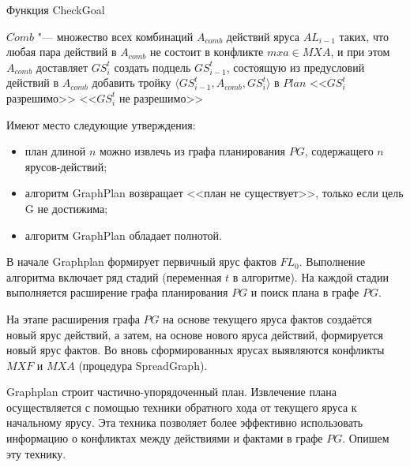 \documentclass[b5paper,11pt]{book}
\begin{document}
	\begin{algorithm}[h]
		\caption{Функция CheckGoal}\label{alg:checkgoal}
		\begin{algorithmic}[1]
				\Statex{}
				\Statex{}
				\State $Comb$ "--- множество всех комбинаций $A_{comb}$ действий яруса $AL_{i-1}$ таких, что любая пара действий в $A_{comb}$ не состоит в конфликте $mxa \in MXA$, и при этом $A_{comb}$ доставляет $GS_i^t$
					\State создать подцель $GS_{i-1}^t$, состоящую из предусловий действий в $A_{comb}$
				\EndFor
					\State добавить тройку $\langle GS_{i-1}^t, A_{comb}, GS_i^t\rangle$ в $Plan$
					\State\Return <<$GS_i^t$ разрешимо>>
					\State\Return <<$GS_i^t$ не разрешимо>>
				\EndIf
			\EndFunction
		\end{algorithmic}
	\end{algorithm}
	
	Имеют место следующие утверждения: 
	\begin{itemize}
		\item план длиной $n$ можно извлечь из графа планирования $PG$, содержащего $n$ ярусов-действий;
		\item алгоритм GraphPlan возвращает <<план не существует>>, только если цель G не достижима;
		\item алгоритм GraphPlan обладает полнотой.
	\end{itemize}

	В начале Graphplan формирует первичный ярус фактов $FL_0$. Выполнение алгоритма включает ряд стадий (переменная $t$ в алгоритме). На каждой стадии выполняется расширение графа планирования $PG$ и поиск плана в графе $PG$.
	
	На этапе расширения графа $PG$ на основе текущего яруса фактов создаётся новый ярус действий, а затем, на основе нового яруса действий,	формируется новый ярус фактов. Во вновь сформированных ярусах выявляются конфликты $MXF$ и $MXA$ (процедура SpreadGraph).
	
	Graphplan строит частично-упорядоченный план. Извлечение плана осуществляется с помощью техники обратного хода от текущего яруса к начальному ярусу. Эта техника позволяет более эффективно использовать	информацию о конфликтах между действиями и фактами в графе $PG$. Опишем эту технику.
	
\end{document}
